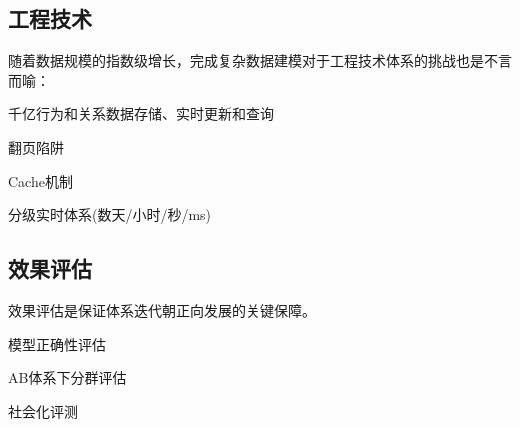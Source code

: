 \subsection{工程技术} 
随着数据规模的指数级增长，完成复杂数据建模对于工程技术体系的挑战也是不言而喻： 
\begin{description}
	\item 千亿行为和关系数据存储、实时更新和查询
	\item 翻页陷阱
	\item Cache机制
	\item 分级实时体系(数天/小时/秒/ms)
\end{description}

\subsection{效果评估}
效果评估是保证体系迭代朝正向发展的关键保障。
\begin{description}
	\item 模型正确性评估
	\item AB体系下分群评估
	\item 社会化评测
\end{description} 



